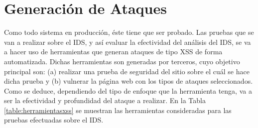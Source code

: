 \section{Generación de Ataques}

Como todo sistema en producción, éste tiene que ser probado. Las pruebas que se van a realizar sobre el IDS, y así evaluar la efectividad del análisis del IDS, se va a hacer uso de herramientas que generan ataques de tipo XSS de forma automatizada. Dichas herramientas son generadas por terceros, cuyo objetivo principal son: (a) realizar una prueba de seguridad del sitio sobre el cuál se hace dicha prueba y (b) vulnerar la página web con los tipos de ataques seleccionados. Como se deduce, dependiendo del tipo de enfoque que la herramienta tenga, va a ser la efectividad y profundidad del ataque a realizar. En la Tabla \ref{table:herramientasxss} se muestran las herramientas consideradas para las pruebas efectuadas sobre el IDS.\\


